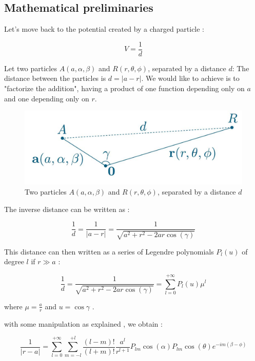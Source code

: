 \documentclass[10pt,twoside,a4paper]{report}
\begin{document}
	\subsection{Mathematical preliminaries}
	
	Let's move back to the potential created by a charged particle :
	
	\begin{equation*}
	V = \frac{1}{d}
	\end{equation*}
	
	Let two particles $A(a,\alpha,\beta)$ and $R(r,\theta,\phi)$, separated by a distance $d$: The distance between the particles is $d = |a - r|$.
	We would like to achieve is to "factorize the addition", having a product of one function depending only on $a$ and one depending only on $r$.
	
	
\begin{figure}[H]
\includegraphics[scale=0.4]{distance}
 \centering 
\caption{Two particles $A(a,\alpha,\beta)$ and $R(r,\theta,\phi)$, separated by a distance $d$}
\label{fig:poster}
\end{figure}	
	
	
	The inverse distance can be written as :
	
	\begin{equation*}
		\frac{1}{d} = \frac{1}{|a-r|} = \frac{1}{\sqrt{a^2 + r^2 - 2ar \cos(\gamma)}}
	\end{equation*}

	This distance can then written as a series of Legendre polynomials  $P_l(u)$ of degree $l$ if $r \gg a$ :
	
	\begin{equation}
		\frac{1}{d} = \frac{1}{\sqrt{a^2 + r^2 - 2ar \cos(\gamma)}} = \sum\limits_{l=0}^{+\infty} P_l(u)\mu^l
	\end{equation}
	
	
	where $\mu = \frac{a}{r}$ and $u = \cos{\gamma}$ .
	
	with some manipulation as explained \cite{phdIvo} , we obtain : 
	
	\begin{equation}
	\frac{1}{|r - a|} = \sum\limits_{l=0}^{+\infty} \sum\limits_{m = -l}^{+l} \frac{(l-m)!}{(l+m)!} \frac{a^l}{r^{l+1}} P_{lm}\cos{(\alpha)}P_{lm}\cos{(\theta)}e^{-im(\beta - \phi)}
	\end{equation}
	
\end{document}
